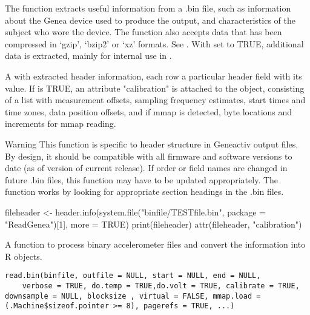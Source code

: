 \documentclass[a4paper]{book}
\begin{document}
%
\begin{Details}\relax
The function extracts useful information from a .bin file, such as information about the Genea device used to produce the output, and characteristics of the subject who wore the device. The function also accepts data that has been compressed in `gzip', `bzip2' or `xz' formats. See .
With  set to TRUE, additional data is extracted, mainly for internal use in .
\end{Details}
%
\begin{Value}
A  with extracted header information, each row a particular header field with its value. 
If  is TRUE, an attribute "calibration" is attached to the object, consisting of a list with measurement offsets, sampling frequency estimates, start times and time zones, data position offsets, and if mmap is detected, byte locations and increments for mmap reading.
\end{Value}
%
\begin{Section}{Warning}
This function is specific to header structure in Geneactiv output files. By design, it should be compatible with all firmware and software versions to date (as of version of current release). If order or field names are changed in future .bin files, this function may have to be updated appropriately.
The function works by looking for appropriate section headings in the .bin files.
\end{Section}
%
\begin{SeeAlso}\relax
{}
\end{SeeAlso}
%
\begin{Examples}
\begin{ExampleCode}

fileheader <- header.info(system.file("binfile/TESTfile.bin", package = "ReadGenea")[1], more = TRUE)
print(fileheader)
attr(fileheader, "calibration")
\end{ExampleCode}
\end{Examples}
%
\begin{Description}\relax
A function to process binary accelerometer files and convert the information into R objects.
\end{Description}
%
\begin{Usage}
\begin{verbatim}
read.bin(binfile, outfile = NULL, start = NULL, end = NULL, 
    verbose = TRUE, do.temp = TRUE,do.volt = TRUE, calibrate = TRUE, downsample = NULL, blocksize , virtual = FALSE, mmap.load = (.Machine$sizeof.pointer >= 8), pagerefs = TRUE, ...)
\end{verbatim}
\end{Usage}
\end{document}
